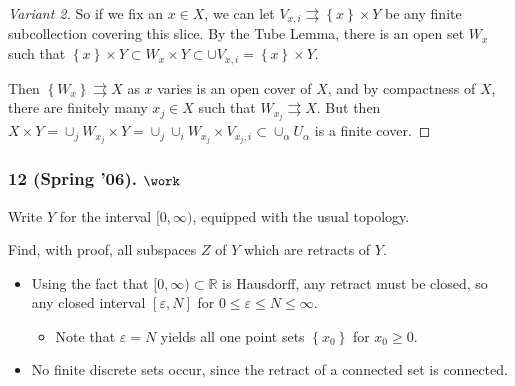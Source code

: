 \begin{solution}
\begin{proof}[Variant 2]
So if we fix an \(x\in X\), we can let
\(V_{x, i} \rightrightarrows \left\{{x}\right\} \times Y\) be any finite
subcollection covering this slice. By the Tube Lemma, there is an open
set \(W_x\) such that
\(\left\{{x}\right\} \times Y \subset W_x \times Y \subset \cup V_{x, i} = \left\{{x}\right\} \times Y\).

Then \(\left\{{W_x}\right\} \rightrightarrows X\) as \(x\) varies is an
open cover of \(X\), and by compactness of \(X\), there are finitely
many \(x_j \in X\) such that \(W_{x_j} \rightrightarrows X\). But then
\(X \times Y = \cup_{j} W_{x_j} \times Y = \cup_j \cup_i W_{x_j} \times V_{x_j, i} \subset \cup_\alpha U_\alpha\)
is a finite cover.

\end{proof}

\end{solution}

\hypertarget{spring-06.-work}{%
\subsubsection{\texorpdfstring{12 (Spring '06).
\(\work\)}{12 (Spring '06). \textbackslash work}}\label{spring-06.-work}}

\begin{problem}[Spring 2006, 12]

Write \(Y\) for the interval \([0, \infty)\), equipped with the usual
topology.

Find, with proof, all subspaces \(Z\) of \(Y\) which are retracts of
\(Y\).

\end{problem}


\begin{solution}

\envlist

\begin{concept}

\envlist

\end{concept}

\begin{itemize}
\tightlist
\item
  Using the fact that \([0, \infty) \subset {\mathbb{R}}\) is Hausdorff,
  any retract must be closed, so any closed interval
  \([\varepsilon, N]\) for \(0\leq \varepsilon\leq N \leq \infty\).

  \begin{itemize}
  \tightlist
  \item
    Note that \(\varepsilon= N\) yields all one point sets
    \(\left\{{x_0}\right\}\) for \(x_0 \geq 0\).
  \end{itemize}
\item
  No finite discrete sets occur, since the retract of a connected set is
  connected.
\end{itemize}

\end{solution}

